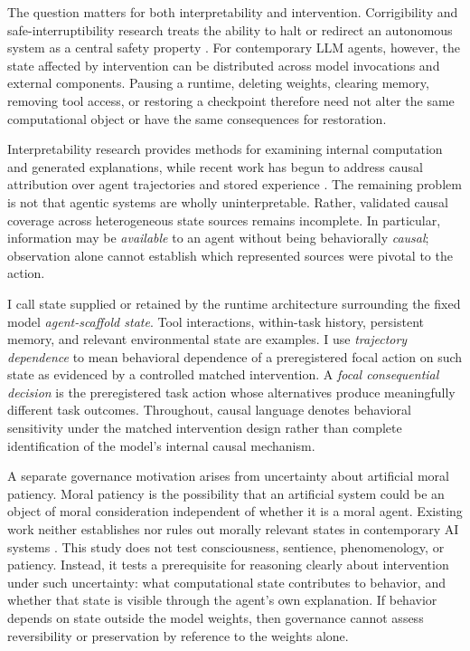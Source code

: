 \documentclass[conference]{IEEEtran}
\begin{document}
The question matters for both interpretability and intervention. Corrigibility and safe-interruptibility research treats the ability to halt or redirect an autonomous system as a central safety property \cite{b4,b5,b6}. For contemporary LLM agents, however, the state affected by intervention can be distributed across model invocations and external components. Pausing a runtime, deleting weights, clearing memory, removing tool access, or restoring a checkpoint therefore need not alter the same computational object or have the same consequences for restoration.

Interpretability research provides methods for examining internal computation and generated explanations, while recent work has begun to address causal attribution over agent trajectories and stored experience \cite{b7,b8,b9,b10,b11,b12,b13,b14}. The remaining problem is not that agentic systems are wholly uninterpretable. Rather, validated causal coverage across heterogeneous state sources remains incomplete. In particular, information may be \emph{available} to an agent without being behaviorally \emph{causal}; observation alone cannot establish which represented sources were pivotal to the action.

I call state supplied or retained by the runtime architecture surrounding the fixed model \emph{agent-scaffold state}. Tool interactions, within-task history, persistent memory, and relevant environmental state are examples. I use \emph{trajectory dependence} to mean behavioral dependence of a preregistered focal action on such state as evidenced by a controlled matched intervention. A \emph{focal consequential decision} is the preregistered task action whose alternatives produce meaningfully different task outcomes. Throughout, causal language denotes behavioral sensitivity under the matched intervention design rather than complete identification of the model's internal causal mechanism.

A separate governance motivation arises from uncertainty about artificial moral patiency. Moral patiency is the possibility that an artificial system could be an object of moral consideration independent of whether it is a moral agent. Existing work neither establishes nor rules out morally relevant states in contemporary AI systems \cite{b15,b16,b17}. This study does not test consciousness, sentience, phenomenology, or patiency. Instead, it tests a prerequisite for reasoning clearly about intervention under such uncertainty: what computational state contributes to behavior, and whether that state is visible through the agent's own explanation. If behavior depends on state outside the model weights, then governance cannot assess reversibility or preservation by reference to the weights alone.
\end{document}
